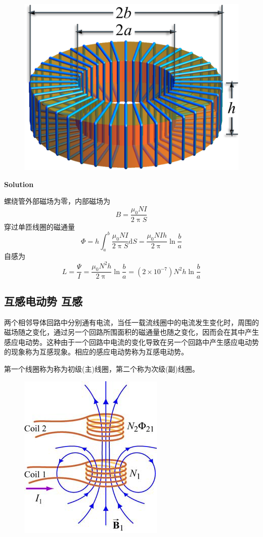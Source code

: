 \documentclass[
	12pt, %
	a4paper, %
]{myLegrandOrangeBook}
\newcommand{\rmd}{\mathrm{d}}
\begin{document}
\begin{figure}[!h]
    \centering
    \includegraphics[width = .25\textwidth]{graphics/自感例题.png}
\end{figure}

    \textbf{Solution}
    \vspace{1em}

螺绕管外部磁场为零，内部磁场为
\begin{equation}
    B = \frac{\mu_0 NI}{2\uppi S}
\end{equation}
穿过单匝线圈的磁通量
\begin{equation}
    \varPhi = h \int_{a}^{b} \frac{\mu_0 NI}{2\uppi S} \rmd S = \frac{\mu_0 NIh}{2\uppi} \ln \frac{b}{a}
\end{equation}
自感为
\begin{equation}
    L = \frac{\varPsi}{I} = \frac{\mu_0 N^2 h}{2 \uppi} \ln \frac{b}{a} = \left(2 \times 10^{-7}\right) N^2 h \ln \frac{b}{a}
\end{equation}

\subsection{互感电动势 \quad 互感}

\begin{definition}[互感]
    两个相邻导体回路中分别通有电流，当任一载流线圈中的电流发生变化时，周围的磁场随之变化，通过另一个回路所围面积的磁通量也随之变化，因而会在其中产生感应电动势。这种由于一个回路中电流的变化导致在另一个回路中产生感应电动势的现象称为互感现象。相应的感应电动势称为互感电动势。
\end{definition}

第一个线圈称为称为初级(主)线圈，第二个称为次级(副)线圈。

\begin{figure}[!h]
    \centering
    \includegraphics[width = .2\textwidth]{graphics/互感.png}
\end{figure}
\end{document}
